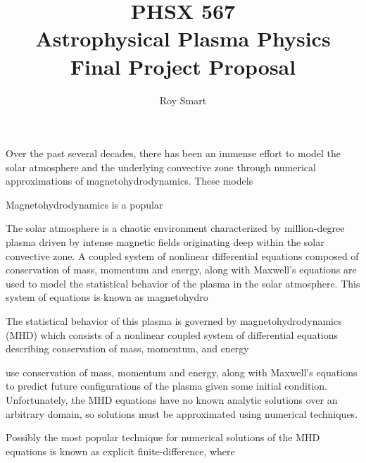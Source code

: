 \documentclass[10pt,letterpaper]{article}
\title{PHSX 567 \\ Astrophysical Plasma Physics \\ Final Project Proposal}
\author{Roy Smart}
\begin{document}
	
	\maketitle
	
	\noindent
	
	Over the past several decades, there has been an immense effort to model the solar atmosphere and the underlying convective zone through numerical approximations of magnetohydrodynamics. These models 
	
	Magnetohydrodynamics is a popular 
	
	The solar atmosphere is a chaotic environment characterized by million-degree plasma driven by intense magnetic fields originating deep within the solar convective zone. 
	A coupled system of nonlinear differential equations composed of conservation of mass, momentum and energy, along with Maxwell's equations are used to model the statistical behavior of the plasma in the solar atmosphere. This system of equations is known as magnetohydro
	
	
	The statistical behavior of this plasma is governed by magnetohydrodynamics (MHD) which consists of a nonlinear coupled system of differential equations describing conservation of mass, momentum, and energy
	
	
	use conservation of mass, momentum and energy, along with Maxwell's equations to predict future configurations of the plasma given some initial condition. 
	Unfortunately, the MHD equations have no known analytic solutions over an arbitrary domain, so solutions must be approximated using numerical techniques.
	
	Possibly the most popular technique for numerical solutions of the MHD equations is known as explicit finite-difference, where
	
\end{document}
